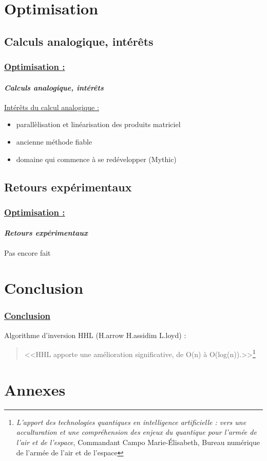 \documentclass[10pt]{beamer}
\begin{document}
	\section{Optimisation}
	\subsection{Calculs analogique, int\'er\^ets}
	\begin{frame}
		\frametitle{\uline{Optimisation :}}
		\framesubtitle{\textit{Calculs analogique, int\'er\^ets}}
		\uline{Int\'er\^ets du calcul analogique :}
		\begin{itemize}
			\item parall\`elisation et linéarisation des produits matriciel
			\item ancienne m\'ethode fiable
			\item domaine qui commence \`a se red\'evelopper (Mythic)
		\end{itemize}
	\end{frame}
	\subsection{Retours exp\'erimentaux}
	\begin{frame}
		\frametitle{\uline{Optimisation :}}
		\framesubtitle{\textit{Retours exp\'erimentaux}}
		Pas encore fait
	\end{frame}
	
	
	
	\section{Conclusion}
	\begin{frame}
		\frametitle{\uline{Conclusion}}
		\centering
  		\vfill
		Algorithme d'inversion HHL (H.arrow H.assidim L.loyd) :
		\begin{quote}
			<<HHL apporte une amélioration significative, de O(n) à O(log(n)).>>\footnote{\textit{L’apport des technologies quantiques en intelligence artificielle : vers une acculturation et une compr\'ehension des enjeux du quantique pour l’arm\'ee de l’air et de l’espace}, Commandant Campo Marie-\'Elisabeth, Bureau num\'erique de l’arm\'ee de l’air et de l’espace}
		\end{quote}
	\end{frame}
	
	\section{Annexes}
\end{document}
